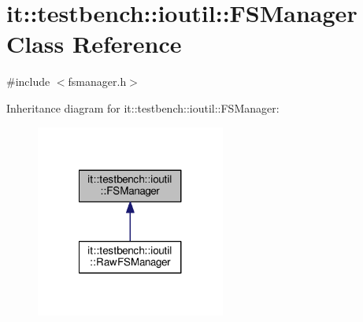 \hypertarget{classit_1_1testbench_1_1ioutil_1_1FSManager}{\section{it\-:\-:testbench\-:\-:ioutil\-:\-:F\-S\-Manager Class Reference}
\label{df/d99/classit_1_1testbench_1_1ioutil_1_1FSManager}
}


{\ttfamily \#include $<$fsmanager.\-h$>$}



Inheritance diagram for it\-:\-:testbench\-:\-:ioutil\-:\-:F\-S\-Manager\-:
\nopagebreak
\begin{figure}[H]
\begin{center}
\leavevmode
\includegraphics[width=176pt]{d6/dfa/classit_1_1testbench_1_1ioutil_1_1FSManager__inherit__graph}
\end{center}
\end{figure}

